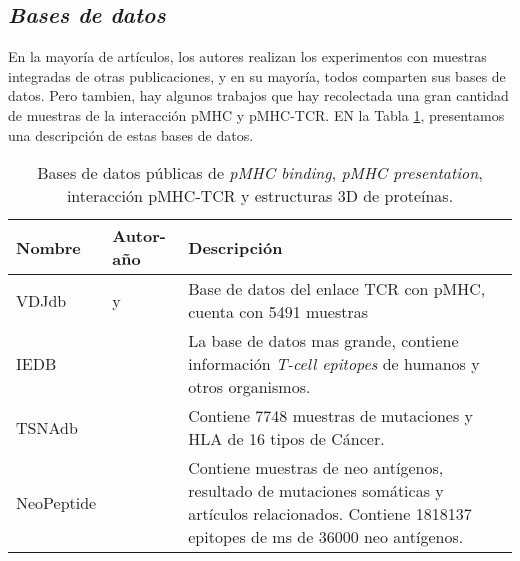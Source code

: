 \subsection{\textit{Bases de datos}}

En la mayoría de artículos, los autores realizan los experimentos con muestras integradas de otras publicaciones, y en su mayoría, todos comparten sus bases de datos. Pero tambien, hay algunos trabajos que hay recolectada una gran cantidad de muestras de la interacción pMHC y pMHC-TCR. EN la Tabla \ref{tab_bd}, presentamos una descripción de estas bases de datos.

\begin{table}[H]
	\caption{Bases de datos públicas de \textit{pMHC binding}, \textit{pMHC presentation}, interacción pMHC-TCR y estructuras 3D de proteínas.}
	\label{tab_bd}
	\begin{tabular}{lp{3cm}p{8cm}}
		\textbf{Nombre} & \textbf{Autor-año}                                                                & \textbf{Descripción}                                                                                                                                                                                      \\ \hline
		VDJdb           & \cite{shugay2018vdjdb} y \cite{bagaev2020vdjdb}& Base de datos del enlace TCR con pMHC, cuenta con 5491 muestras                                                                                                                                           \\
		IEDB            & \cite{vita2019immune}                                           & La base de datos mas grande, contiene información \textit{T-cell epitopes} de humanos y otros organismos.                                                                                                          \\
		TSNAdb          & \cite{wu2018tsnadb}                                             & Contiene 7748 muestras de mutaciones y HLA de 16 tipos de Cáncer.                                                                                                                                         \\
		NeoPeptide      & \cite{zhou2019neopeptide}                                       & Contiene muestras de neo antígenos, resultado de mutaciones somáticas y artículos relacionados. Contiene 1818137 epitopes de ms de 36000 neo antígenos.                                                   \\

\end{tabular}
\end{table}
